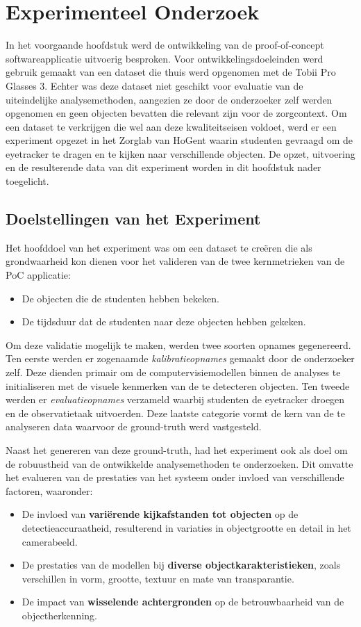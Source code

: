 \chapter{Experimenteel Onderzoek}
\label{ch:experiment}

In het voorgaande hoofdstuk werd de ontwikkeling van de proof-of-concept softwareapplicatie uitvoerig besproken.
Voor ontwikkelingsdoeleinden werd gebruik gemaakt van een dataset die thuis werd opgenomen met de Tobii Pro Glasses 3.
Echter was deze dataset niet geschikt voor evaluatie van de uiteindelijke analysemethoden, aangezien ze door de onderzoeker zelf werden opgenomen en geen objecten bevatten die relevant zijn voor de zorgcontext.
Om een dataset te verkrijgen die wel aan deze kwaliteitseisen voldoet, werd er een experiment opgezet in het Zorglab van HoGent waarin studenten gevraagd om de eyetracker te dragen en te kijken naar verschillende objecten.
De opzet, uitvoering en de resulterende data van dit experiment worden in dit hoofdstuk nader toegelicht.

\section{Doelstellingen van het Experiment}

Het hoofddoel van het experiment was om een dataset te creëren die als grondwaarheid kon dienen voor het valideren van de twee kernmetrieken van de PoC applicatie:
\begin{itemize}
    \item De objecten die de studenten hebben bekeken.
    \item De tijdsduur dat de studenten naar deze objecten hebben gekeken.
\end{itemize}
Om deze validatie mogelijk te maken, werden twee soorten opnames gegenereerd. 
Ten eerste werden er zogenaamde \textit{kalibratieopnames} gemaakt door de onderzoeker zelf. 
Deze dienden primair om de computervisiemodellen binnen de analyses te initialiseren met de visuele kenmerken van de te detecteren objecten. 
Ten tweede werden er \textit{evaluatieopnames} verzameld waarbij studenten de eyetracker droegen en de observatietaak uitvoerden. 
Deze laatste categorie vormt de kern van de te analyseren data waarvoor de ground-truth werd vastgesteld.

Naast het genereren van deze ground-truth, had het experiment ook als doel om de robuustheid van de ontwikkelde analysemethoden te onderzoeken. 
Dit omvatte het evalueren van de prestaties van het systeem onder invloed van verschillende factoren, waaronder:
\begin{itemize}
    \item De invloed van \textbf{variërende kijkafstanden tot objecten} op de detectieaccuraatheid, resulterend in variaties in objectgrootte en detail in het camerabeeld.
    \item De prestaties van de modellen bij \textbf{diverse objectkarakteristieken}, zoals verschillen in vorm, grootte, textuur en mate van transparantie.
    \item De impact van \textbf{wisselende achtergronden} op de betrouwbaarheid van de objectherkenning.
\end{itemize}

